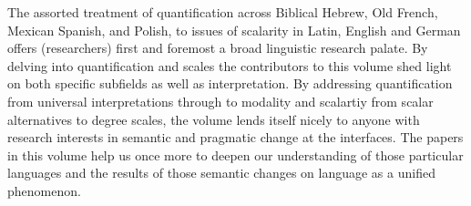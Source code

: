 \documentclass[output=paper]{langsci/langscibook}
\begin{document}
The assorted treatment of quantification across Biblical Hebrew, Old French, Mexican Spanish, and Polish, to issues of scalarity in Latin, English and German offers (researchers) first and foremost a broad linguistic research palate. By delving into quantification and scales the contributors to this volume shed light on both specific subfields as well as interpretation.  By addressing quantification from universal interpretations through to modality and scalartiy from scalar alternatives to degree scales, the volume lends itself nicely to anyone with research interests in semantic and pragmatic change at the interfaces. The papers in this volume help us once more to deepen our understanding of those particular languages and the results of those semantic changes on language as a unified phenomenon. 



\end{document}
